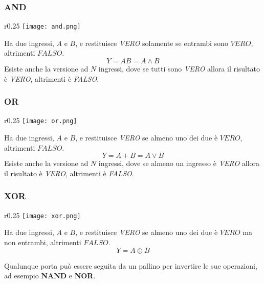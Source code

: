 \subsubsection{AND}
\begin{wrapfigure}{r}{0.25\textwidth}
	\texttt{[image: and.png]}
\end{wrapfigure}
Ha due ingressi, $A$ e $B$, e restituisce \textit{VERO} solamente se entrambi sono $VERO$, altrimenti $FALSO$.
\begin{equation*}
	Y = AB = A \land B
\end{equation*}
Esiste anche la versione ad $N$ ingressi, dove se tutti sono \textit{VERO} allora il risultato è \textit{VERO}, altrimenti è \textit{FALSO}.

\subsubsection{OR}
\begin{wrapfigure}{r}{0.25\textwidth}
	\texttt{[image: or.png]}
\end{wrapfigure}
Ha due ingressi, $A$ e $B$, e restituisce \textit{VERO} se almeno uno dei due è $VERO$, altrimenti $FALSO$.
\begin{equation*}
	Y = A + B = A \lor B
\end{equation*}
Esiste anche la versione ad $N$ ingressi, dove se almeno un ingresso è \textit{VERO} allora il risultato è \textit{VERO}, altrimenti è \textit{FALSO}.

\subsubsection{XOR}
\begin{wrapfigure}{r}{0.25\textwidth}
	\texttt{[image: xor.png]}
\end{wrapfigure}
Ha due ingressi, $A$ e $B$, e restituisce \textit{VERO} se almeno uno dei due è $VERO$ ma non entrambi, altrimenti $FALSO$.
\begin{equation*}
	Y = A \oplus B
\end{equation*}

\begin{observation}
	Qualunque porta può essere seguita da un pallino per invertire le sue operazioni, ad esempio \textbf{NAND} e \textbf{NOR}.
\end{observation}